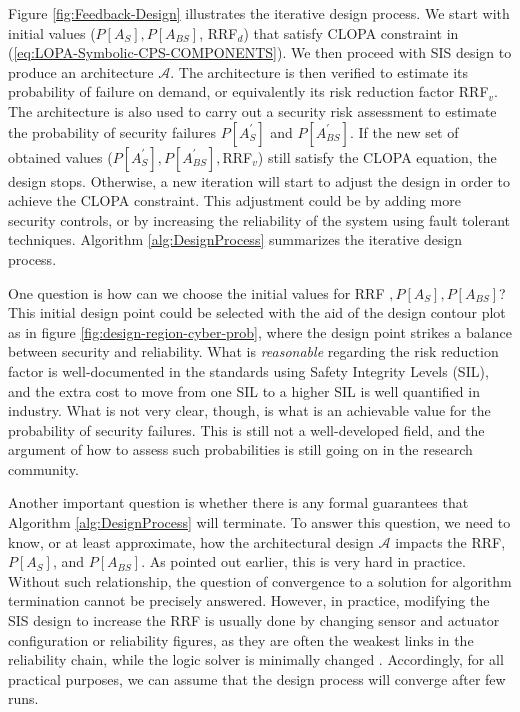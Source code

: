 \documentclass[journal]{IEEEtran}
\begin{document}
Figure \ref{fig:Feedback-Design} illustrates the iterative design process. We start with initial values ($P[A_S], P[A_{BS}]$, RRF$_d$) that satisfy CLOPA constraint in (\ref{eq:LOPA-Symbolic-CPS-COMPONENTS}). We then proceed with SIS design to produce an architecture $\mathcal{A}$. The architecture is then verified to estimate its probability of failure on demand, or equivalently its risk reduction factor RRF$_v$. The architecture is also used to carry out a security risk assessment to estimate the probability of security failures $P[A^\prime_S]$ and $P[A^\prime_{BS}]$. If the new set of obtained values ($P[A^\prime_S], P[A^\prime_{BS}], $RRF$_v$) still satisfy the CLOPA equation, the design stops. Otherwise, a new iteration will start to adjust the design in order to achieve the CLOPA constraint. This adjustment could be by adding more security controls, or by increasing the reliability of the system using fault tolerant techniques. Algorithm \ref{alg:DesignProcess} summarizes the iterative design process.

One question is how can we choose the initial values for RRF $, P[A_S], P[A_{BS}]$? This initial design point could be selected with the aid of the design contour plot as in figure \ref{fig:design-region-cyber-prob}, where the design point strikes a balance between security and reliability. What is \emph{reasonable} regarding the risk reduction factor is well-documented in the standards using Safety Integrity Levels (SIL), and the extra cost to move from one SIL to a higher SIL is well quantified in industry. What is not very clear, though, is what is an achievable value for the probability of security failures. This is still not a well-developed field, and the argument of how to assess such probabilities is still going on in the research community.

Another important question is whether there is any formal guarantees that Algorithm \ref{alg:DesignProcess} will terminate. To answer this question, we need to know, or at least approximate, how the architectural design $\mathcal{A}$ impacts the RRF, $P[A_S]$, and $P[A_{BS}]$. As pointed out earlier, this is very hard in practice. Without such relationship, the question of convergence to a solution for algorithm termination cannot be precisely answered. However, in practice, modifying the SIS design to increase the RRF is usually done by changing sensor and actuator configuration or reliability figures, as they are often the weakest links in the reliability chain, while the logic solver is minimally changed \cite{IEC61511}. Accordingly, for all practical purposes, we can assume that the design process will converge after few runs.
\end{document}
